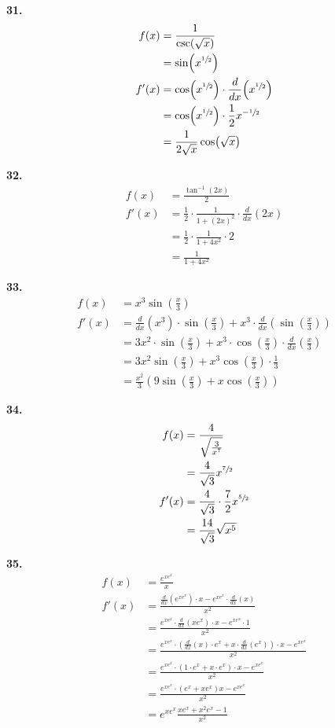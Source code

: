 \documentclass[10pt,oneside,]{book}
\theoremstyle{plain}
\theoremstyle{definition}
\numberwithin{equation}{section}
\newcommand{\fe}[2]{#1\mathopen{}\left(#2\right)\mathclose{}}
\newcommand{\fd}[1]{#1'}
\newcommand{\lzoo}[2]{{\frac{d}{d#1}}{\left(#2\right)}}
\begin{document}
\par\smallskip
\noindent\textbf{31.}\quad{}\begin{align*}
\fe{f}{x}&=\frac{1}{\fe{\csc}{\sqrt{x}}}\\
&=\fe{\sin}{x^{\sfrac{1}{2}}}\\
\fe{\fd{f}}{x}&=\fe{\cos}{x^{\sfrac{1}{2}}}\cdot\lzoo{x}{x^{\sfrac{1}{2}}}\\
&=\fe{\cos}{x^{\sfrac{1}{2}}}\cdot\frac{1}{2}x^{-\sfrac{1}{2}}\\
&=\frac{1}{2\sqrt{x}}\fe{\cos}{\sqrt{x}}
\end{align*}%
\par\smallskip
\noindent\textbf{32.}\quad{}\begin{align*}
\fe{f}{x}&=\frac{\fe{\tan^{-1}}{2x}}{2}\\
\fe{\fd{f}}{x}&=\frac{1}{2}\cdot\frac{1}{1+(2x)^2}\cdot\lzoo{x}{2x}\\
&=\frac{1}{2}\cdot\frac{1}{1+4x^2}\cdot2\\
&=\frac{1}{1+4x^2}
\end{align*}%
\par\smallskip
\noindent\textbf{33.}\quad{}\begin{align*}
\fe{f}{x}&=x^3\fe{\sin}{\frac{x}{3}}\\
\fe{\fd{f}}{x}&=\lzoo{x}{x^3}\cdot\fe{\sin}{\frac{x}{3}}+x^3\cdot\lzoo{x}{\fe{\sin}{\frac{x}{3}}}\\
&=3x^2\cdot\fe{\sin}{\frac{x}{3}}+x^3\cdot\fe{\cos}{\frac{x}{3}}\cdot\lzoo{x}{\frac{x}{3}}\\
&=3x^2\fe{\sin}{\frac{x}{3}}+x^3\fe{\cos}{\frac{x}{3}}\cdot\frac{1}{3}\\
&=\frac{x^2}{3}\left(9\fe{\sin}{\frac{x}{3}}+x\fe{\cos}{\frac{x}{3}}\right)
\end{align*}%
\par\smallskip
\noindent\textbf{34.}\quad{}\begin{align*}
\fe{f}{x}&=\frac{4}{\sqrt{\frac{3}{x^7}}}\\
&=\frac{4}{\sqrt{3}}x^{\sfrac{7}{2}}\\
\fe{\fd{f}}{x}&=\frac{4}{\sqrt{3}}\cdot\frac{7}{2}x^{\sfrac{5}{2}}\\
&=\frac{14}{\sqrt{3}}\sqrt{x^5}
\end{align*}%
\par\smallskip
\noindent\textbf{35.}\quad{}\begin{align*}
\fe{f}{x}&=\frac{e^{xe^x}}{x}\\
\fe{\fd{f}}{x}&=\frac{\lzoo{x}{e^{xe^x}}\cdot x-e^{xe^x}\cdot\lzoo{x}{x}}{x^2}\\
&=\frac{e^{xe^x}\cdot\lzoo{x}{xe^x}\cdot x-e^{xe^x}\cdot1}{x^2}\\
&=\frac{e^{xe^x}\cdot\left(\lzoo{x}{x}\cdot e^x+x\cdot\lzoo{x}{e^x}\right)\cdot x-e^{xe^x}}{x^2}\\
&=\frac{e^{xe^x}\cdot\left(1\cdot e^x+x\cdot e^x\right)\cdot x-e^{xe^x}}{x^2}\\
&=\frac{e^{xe^x}\cdot\left(e^x+xe^x\right) x-e^{xe^x}}{x^2}\\
&=e^{xe^x}\frac{xe^x+x^2e^x-1}{x^2}
\end{align*}%
\end{document}
